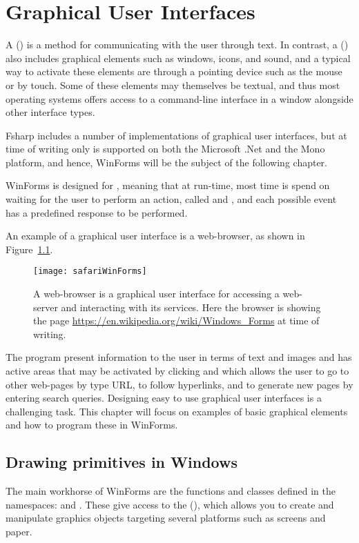 \chapter{Graphical User Interfaces}
\label{chap:windows}

A  () is a method for communicating with the user through text. In contrast, a  () also includes graphical elements such as  windows, icons, and sound, and a typical way to activate these elements are through a pointing device such as the mouse or by touch. Some of these elements may themselves be textual, and thus most operating systems offers access to a command-line interface in a window alongside other interface types.

Fsharp includes a number of implementations of graphical user interfaces, but at time of writing only  is supported on both the Microsoft .Net and the Mono platform, and hence, WinForms will be the subject of the following chapter.

WinForms is designed for , meaning that at run-time, most time is spend on waiting for the user to perform an action, called and , and each possible event has a predefined response to be performed. 

An example of a graphical user interface is a web-browser, as shown in Figure~\ref{fig:safariGui}.
\begin{figure}
  \centering
  \texttt{[image: safariWinForms]}
  \caption{A web-browser is a graphical user interface for accessing a web-server and interacting with its services. Here the browser is showing the page \url{https://en.wikipedia.org/wiki/Windows_Forms} at time of writing.}
  \label{fig:safariGui}
\end{figure}
The program present information to the user in terms of text and images and has active areas that may be activated by clicking and which allows the user to go to other web-pages by type URL, to follow hyperlinks, and to generate new pages by entering search queries. Designing easy to use graphical user interfaces is a challenging task. This chapter will focus on examples of basic graphical elements and how to program these in WinForms.

\section{Drawing primitives in Windows}
The main workhorse of WinForms are the functions and classes defined in the namespaces:   and . These give access to the  (), which allows you to create and manipulate graphics objects targeting several platforms such as screens and paper. 

